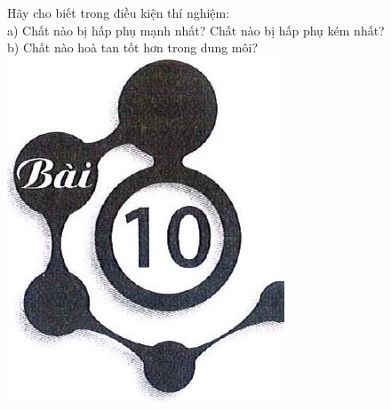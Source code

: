 \documentclass[10pt]{article}
\begin{document}
Hãy cho biết trong điều kiện thí nghiệm:\\
a) Chất nào bị hấp phụ mạnh nhất? Chất nào bị hấp phụ kém nhất?\\
b) Chất nào hoà tan tốt hơn trong dung môi?\\
\includegraphics[max width=\textwidth, center]{2025_10_23_ae7aef68fb3b41082d29g-18}
\end{document}
